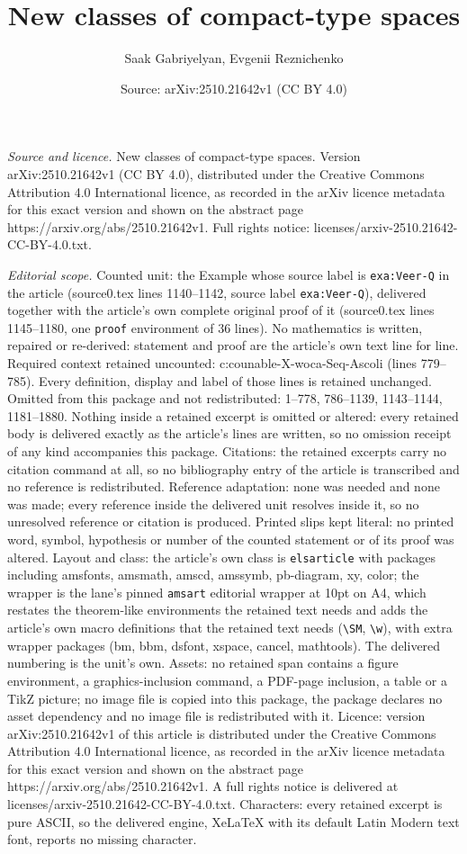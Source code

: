 \documentclass[10pt,a4paper]{amsart}
\title[New classes of compact-type spaces]{New classes of compact-type spaces}
\author{Saak Gabriyelyan, Evgenii Reznichenko}
\date{Source: arXiv:2510.21642v1 (CC BY 4.0)}
\begin{document}
\maketitle

\noindent\emph{Source and licence.} New classes of compact-type spaces. Version arXiv:2510.21642v1 (CC BY 4.0), distributed under the Creative Commons Attribution 4.0 International licence, as recorded in the arXiv licence metadata for this exact version and shown on the abstract page https://arxiv.org/abs/2510.21642v1. Full rights notice: licenses/arxiv-2510.21642-CC-BY-4.0.txt.\par\smallskip

\noindent\textit{Editorial scope.} Counted unit: the Example whose source label is \texttt{exa:Veer-Q} in the article (source0.tex lines 1140--1142, source label \texttt{exa:Veer-Q}), delivered together with the article's own complete original proof of it (source0.tex lines 1145--1180, one \texttt{proof} environment of 36 lines). No mathematics is written, repaired or re-derived: statement and proof are the article's own text line for line. Required context retained uncounted: c:counable-X-woca-Seq-Ascoli (lines 779--785). Every definition, display and label of those lines is retained unchanged. Omitted from this package and not redistributed: 1--778, 786--1139, 1143--1144, 1181--1880. Nothing inside a retained excerpt is omitted or altered: every retained body is delivered exactly as the article's lines are written, so no omission receipt of any kind accompanies this package. Citations: the retained excerpts carry no citation command at all, so no bibliography entry of the article is transcribed and no reference is redistributed. Reference adaptation: none was needed and none was made; every reference inside the delivered unit resolves inside it, so no unresolved reference or citation is produced. Printed slips kept literal: no printed word, symbol, hypothesis or number of the counted statement or of its proof was altered. Layout and class: the article's own class is \texttt{elsarticle} with packages including amsfonts, amsmath, amscd, amssymb, pb-diagram, xy, color; the wrapper is the lane's pinned \texttt{amsart} editorial wrapper at 10pt on A4, which restates the theorem-like environments the retained text needs and adds the article's own macro definitions that the retained text needs (\texttt{\textbackslash SM}, \texttt{\textbackslash w}), with extra wrapper packages (bm, bbm, dsfont, xspace, cancel, mathtools). The delivered numbering is the unit's own. Assets: no retained span contains a figure environment, a graphics-inclusion command, a PDF-page inclusion, a table or a TikZ picture; no image file is copied into this package, the package declares no asset dependency and no image file is redistributed with it. Licence: version arXiv:2510.21642v1 of this article is distributed under the Creative Commons Attribution 4.0 International licence, as recorded in the arXiv licence metadata for this exact version and shown on the abstract page https://arxiv.org/abs/2510.21642v1. A full rights notice is delivered at licenses/arxiv-2510.21642-CC-BY-4.0.txt. Characters: every retained excerpt is pure ASCII, so the delivered engine, XeLaTeX with its default Latin Modern text font, reports no missing character.
\end{document}
